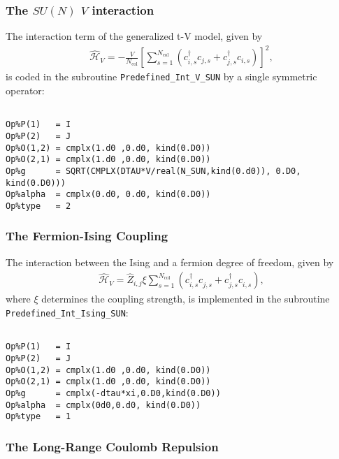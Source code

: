 \subsubsection{The $SU(N)$ $V$ interaction}

The interaction term of the generalized t-V model, given by 
\begin{align}
\hat{\mathcal{H}}_{V} =
-\frac{V}{N_\mathrm{col}}\left[ \sum_{s=1}^{N_\mathrm{col}}\left( c^{\dagger}_{i,s} c_{j,s} + c^{\dagger}_{j,s} c_{i,s} \right) \right]^2,
\end{align} 
is coded in the subroutine \texttt{Predefined\_Int\_V\_SUN} by a single symmetric operator:
\begin{lstlisting}[style=fortran]

Op%P(1)   = I
Op%P(2)   = J
Op%O(1,2) = cmplx(1.d0 ,0.d0, kind(0.D0)) 
Op%O(2,1) = cmplx(1.d0 ,0.d0, kind(0.D0))
Op%g      = SQRT(CMPLX(DTAU*V/real(N_SUN,kind(0.d0)), 0.D0, kind(0.D0))) 
Op%alpha  = cmplx(0.d0, 0.d0, kind(0.D0))
Op%type   = 2

\end{lstlisting}


\subsubsection{The Fermion-Ising Coupling}

The interaction between the Ising and a fermion degree of freedom, given by
\begin{align}
\hat{\mathcal{H}}_{V} =
\hat{Z}_{i,j} \xi  \sum_{s=1}^{N_\mathrm{col}}( c^{\dagger}_{i,s} c^{\phantom\dagger}_{j,s} + c^{\dagger}_{j,s} c^{\phantom\dagger}_{i,s} ),
\end{align} 
where $\xi$ determines the coupling strength, is implemented in the subroutine \texttt{Predefined\_Int\_Ising\_SUN}:
\begin{lstlisting}[style=fortran]

Op%P(1)   = I
Op%P(2)   = J
Op%O(1,2) = cmplx(1.d0 ,0.d0, kind(0.D0)) 
Op%O(2,1) = cmplx(1.d0 ,0.d0, kind(0.D0)) 
Op%g      = cmplx(-dtau*xi,0.D0,kind(0.D0))
Op%alpha  = cmplx(0d0,0.d0, kind(0.D0)) 
Op%type   = 1

\end{lstlisting}



\subsubsection{The Long-Range Coulomb Repulsion}


